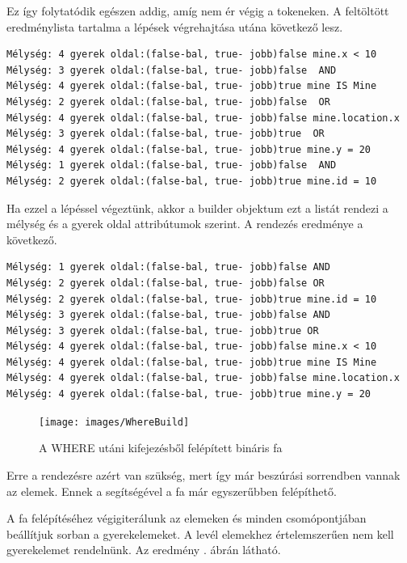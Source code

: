 Ez így folytatódik egészen addig, amíg nem ér végig a tokeneken. A feltöltött eredménylista tartalma a lépések végrehajtása utána következő lesz.

\begin{verbatim}
Mélység: 4 gyerek oldal:(false-bal, true- jobb)false mine.x < 10
Mélység: 3 gyerek oldal:(false-bal, true- jobb)false  AND
Mélység: 4 gyerek oldal:(false-bal, true- jobb)true mine IS Mine 
Mélység: 2 gyerek oldal:(false-bal, true- jobb)false  OR
Mélység: 4 gyerek oldal:(false-bal, true- jobb)false mine.location.x 
Mélység: 3 gyerek oldal:(false-bal, true- jobb)true  OR
Mélység: 4 gyerek oldal:(false-bal, true- jobb)true mine.y = 20 
Mélység: 1 gyerek oldal:(false-bal, true- jobb)false  AND
Mélység: 2 gyerek oldal:(false-bal, true- jobb)true mine.id = 10 
\end{verbatim}

Ha ezzel a lépéssel végeztünk, akkor a builder objektum ezt a listát rendezi a mélység és a gyerek oldal attribútumok szerint. A rendezés eredménye a következő.

\begin{verbatim}
Mélység: 1 gyerek oldal:(false-bal, true- jobb)false AND
Mélység: 2 gyerek oldal:(false-bal, true- jobb)false OR
Mélység: 2 gyerek oldal:(false-bal, true- jobb)true mine.id = 10
Mélység: 3 gyerek oldal:(false-bal, true- jobb)false AND
Mélység: 3 gyerek oldal:(false-bal, true- jobb)true OR
Mélység: 4 gyerek oldal:(false-bal, true- jobb)false mine.x < 10
Mélység: 4 gyerek oldal:(false-bal, true- jobb)true mine IS Mine
Mélység: 4 gyerek oldal:(false-bal, true- jobb)false mine.location.x
Mélység: 4 gyerek oldal:(false-bal, true- jobb)true mine.y = 20
\end{verbatim}

\begin{figure}[htb]
	\begin{center}
		\texttt{[image: images/WhereBuild]}
		\caption{A WHERE utáni kifejezésből felépített bináris fa}
		\label{fig:wherePostorderBuilder}
	\end{center}
\end{figure}


Erre a rendezésre azért van szükség, mert így már beszúrási sorrendben vannak az elemek. Ennek a segítségével a fa már egyszerűbben felépíthető.

A fa felépítéséhez végigiterálunk az elemeken és minden csomópontjában beállítjuk sorban a gyerekelemeket. A levél elemekhez értelemszerűen nem kell gyerekelemet rendelnünk. Az eredmény . ábrán látható.

